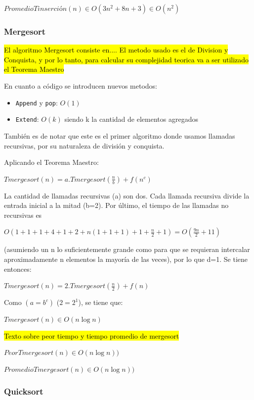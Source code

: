 \documentclass[article,a4paper]{article}
\begin{document}
$PromedioTinserción(n) \in O(3n^2 + 8n + 3) \in O(n^2)$

\subsubsection{Mergesort}

\hl{El algoritmo Mergesort consiste en.... El metodo usado es el de Division y Conquista, y por lo tanto, para calcular su complejidad teorica va a ser utilizado el Teorema Maestro}

En cuanto a código se introducen nuevos metodos:

\begin{itemize}
\item \texttt{Append} y \texttt{pop}: $O(1)$
\item \texttt{Extend}: $O(k)$ siendo k la cantidad de elementos agregados 
\end{itemize}

También es de notar que este es el primer algoritmo donde usamos llamadas recursivas, por su naturaleza de división y conquista.

Aplicando el Teorema Maestro: 

$Tmergesort(n) = a.Tmergesort(\frac{n}{b}) + f(n^c)$

La cantidad de llamadas recursivas (a) son dos. Cada llamada recursiva divide la entrada inicial a la mitad (b=2). Por último, el tiempo de las llamadas no recursivas es 

$O(1 + 1 + 1 +4 + 1+ 2 +n(1 + 1 +1) + 1 + \frac{n}{2} +1 ) = O( \frac{9n}{2} +11 )$

(asumiendo un n lo suficientemente grande como para que se requieran intercalar aproximadamente n elementos la mayoría de las veces), por lo que d=1. Se tiene entonces:

$Tmergesort(n) = 2.Tmergesort(\frac{n}{2}) + f(n)$

Como $(a = b^c)$ ($2 = 2^1$), se tiene que:

$Tmergesort(n) \in O(n \log n)$

\hl{Texto sobre peor tiempo y tiempo promedio de mergesort}

$PeorTmergesort(n) \in O(n \log n))$

$PromedioTmergesort(n) \in O(n \log n))$

\subsubsection{Quicksort}
\end{document}
